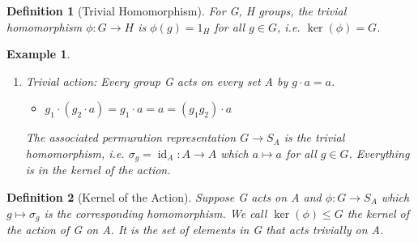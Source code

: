 \documentclass[11pt, oneside]{book}
\theoremstyle{break}
\newtheorem{defn}{Definition}[section]
\newtheorem{eg}{Example}[section]
\DeclareMathOperator{\id}{id}
\begin{document}
\begin{defn}[Trivial Homomorphism]
    For G, H groups, the trivial homomorphism $\phi : G \to H$ is $\phi(g) = 1_H$ for all $g \in G$, i.e. $\ker(\phi) = G$.
\end{defn}

\begin{eg}
    \begin{enumerate}
        \item Trivial action: Every group G acts on every set A by $g \cdot a = a$.
            \begin{itemize}
                \item $g_1 \cdot (g_2 \cdot a) = g_1 \cdot a = a = (g_1 g_2) \cdot a$
            \end{itemize}
            The associated permuration representation $G \to S_A$ is the trivial homomorphism, i.e. 
            $\sigma_g = \id_A : A \to A$ which $a \mapsto a$ for all $g \in G$. Everything is in the kernel of the action.
    \end{enumerate}
\end{eg}

\begin{defn}[Kernel of the Action]
    Suppose G acts on A and $\phi: G \to S_A$ which $g \mapsto \sigma_g$ is the corresponding homomorphism. 
    We call $\ker(\phi) \leq G$ the kernel of the action of G on A. It is the set of elements in G that acts trivially on A.
\end{defn}
\end{document}
